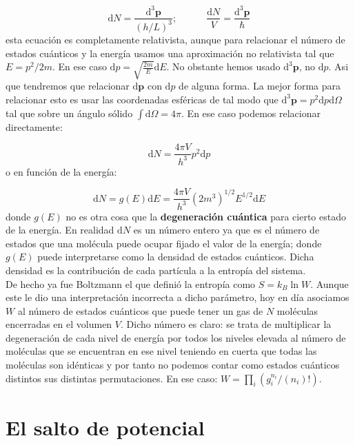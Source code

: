 \documentclass[12pt,a4paper]{article}
\numberwithin{equation}{section}
\numberwithin{figure}{section}
\newcommand{\parentesis}[1]{\left( #1  \right)}
\newcommand{\D}{\mathrm{d}}
\newcommand{\tquad}{\quad \quad \quad}
\newcommand{\pn}{\mathbf{p}}
\begin{document}
\begin{equation}
\D N = \dfrac{\D^3 \pn}{(h /L)^3}; \tquad \dfrac{\D N}{V} = \dfrac{\D^3 \pn}{\hbar}
\end{equation}
esta ecuación es completamente relativista, aunque para relacionar el número de estados cuánticos y la energía usamos una aproximación no relativista tal que $E=p^2/2m$. En ese caso $\D p = \sqrt{\frac{2 m}{ E}} \D E$. No obstante hemos usado $\D^3 \pn$, no $\D p$. Asi que tendremos que relacionar $\D \pn$ con $\D p$ de alguna forma. La mejor forma para relacionar esto es usar las coordenadas esféricas de tal modo que $\D^3 \pn = p^2 \D p \D \Omega$ tal que sobre un ángulo sólido $\int \D \Omega = 4 \pi$. En ese caso podemos relacionar directamente:

\begin{equation}
\D N = \dfrac{4 \pi V}{h^3} p^2 \D p
\end{equation}
o en función de la energía:

\begin{equation}
\D N = g(E) \D E = \dfrac{4 \pi V}{h^3} \parentesis{2 m^3}^{1/2} E^{1/2} \D E
\end{equation}
donde $g(E)$ no es otra cosa que la \textbf{degeneración cuántica} para cierto estado de la energía. En realidad $\D N$ es un número entero ya que es el número de estados que una molécula puede ocupar fijado el valor de la energía; donde $g(E)$ puede interpretarse como la densidad de estados cuánticos. Dicha densidad es la contribución de cada partícula a la entropía del sistema. \\

De hecho ya fue Boltzmann el que definió la entropía como $S = k_B \ln W$. Aunque este le dio una interpretación incorrecta a dicho parámetro, hoy en día asociamos $W$ al número de estados cuánticos que puede tener un gas de $N$ moléculas encerradas en el volumen $V$. Dicho número es claro: se trata de multiplicar la degeneración de cada nivel de energía por todos los niveles elevada al número de moléculas que se encuentran en ese nivel teniendo en cuerta que todas las moléculas son idénticas y por tanto no podemos contar como estados cuánticos distintos sus distintas permutaciones. En ese caso: $W = \prod_i (g_i^{n_i} /(n_i)!)$.  



\section{El salto de potencial}
\end{document}
